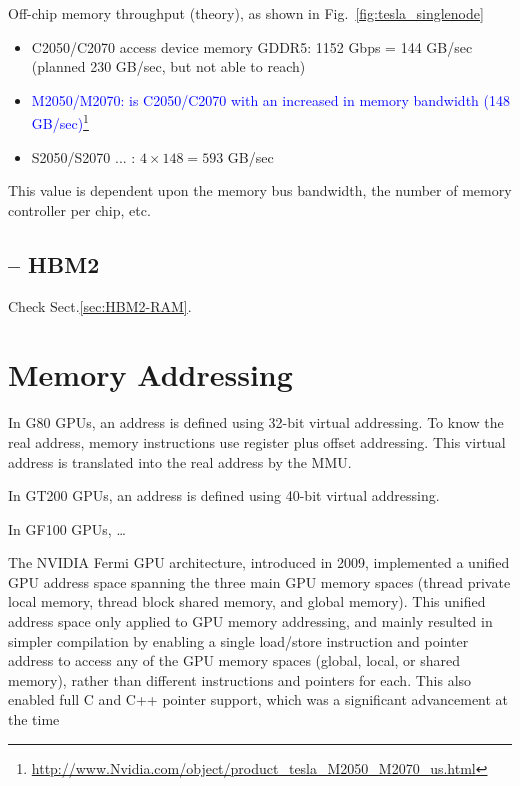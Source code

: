 Off-chip memory throughput (theory), as shown in
  Fig.~\ref{fig:tesla_singlenode}
\begin{itemize}

  \item C2050/C2070 access device memory GDDR5: 1152 Gbps = 144 GB/sec (planned
  230 GB/sec, but not able to reach)

  \item
    \textcolor{blue}{M2050/M2070: is C2050/C2070 with an increased in
      memory bandwidth (148 GB/sec)}\footnote{\url{http://www.Nvidia.com/object/product_tesla_M2050_M2070_us.html}}
   
   \item S2050/S2070 ... : $4\times 148=593$ GB/sec
     
  \end{itemize}
  
This value is dependent upon the memory bus bandwidth, the number of memory controller per chip, etc.
  
\subsection{-- HBM2}

Check Sect.\ref{sec:HBM2-RAM}.


\section{Memory Addressing}
 
 In G80 GPUs, an address is defined using 32-bit virtual addressing. To know the
 real address, memory instructions use register plus offset addressing. This
 virtual address is translated into the real address by the MMU.
  
 In GT200 GPUs, an address is defined using 40-bit virtual addressing.
 
 In GF100 GPUs, \ldots
 
 The NVIDIA Fermi GPU architecture, introduced in 2009, implemented a unified GPU address space
spanning the three main GPU memory spaces (thread private local memory, thread block shared
memory, and global memory). This unified address space only applied to GPU memory addressing, and
mainly resulted in simpler compilation by enabling a single load/store instruction and pointer address to
access any of the GPU memory spaces (global, local, or shared memory), rather than different
instructions and pointers for each. This also enabled full C and C++ pointer support, which was a
significant advancement at the time

